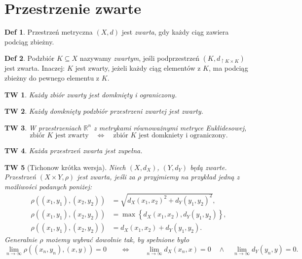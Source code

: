 \documentclass[a4paper, 12pt]{mwart}
\theoremstyle{definition}
\newtheorem{definicja}{Def}[section]
\theoremstyle{plain}
\newtheorem{twierdzenie}{TW}[section]
\theoremstyle{remark}
\begin{document}
\section{Przestrzenie zwarte}
\begin{definicja}
	Przestrzeń metryczna $(X, d)$ jest \emph{zwarta}, gdy każdy ciąg zawiera podciąg zbieżny.
\end{definicja}
\begin{definicja}
	Podzbiór $K \subseteq X$ nazywamy \emph{zwartym}, jeśli podprzestrzeń $(K, d_{\restriction K \times K})$ jest zwarta. Inaczej: $K$ jest zwarty, jeżeli każdy ciąg elementów z $K$, ma podciąg zbieżny do pewnego elementu z $K$.
\end{definicja}
\begin{twierdzenie}
	Każdy zbiór zwarty jest domknięty i ograniczony.
\end{twierdzenie}
\begin{twierdzenie}
	Każdy domknięty podzbiór przestrzeni zwartej jest zwarty.
\end{twierdzenie}
\begin{twierdzenie}
	W przestrzeniach $\mathbb{R}^n$ z metrykami równoważnymi metryce Euklidesowej,
	\begin{equation}
		\text{zbiór } K \text{ jest zwarty} \quad \iff \quad \text{zbiór } K \text{ jest domkniety i ograniczony}.
	\end{equation}
\end{twierdzenie}
\begin{twierdzenie}
	Każda przestrzeń zwarta jest zupełna.
\end{twierdzenie}
\begin{twierdzenie}[Tichonow \ppauza krótka wersja]
	Niech $(X, d_X)$, $(Y, d_Y)$ będą zwarte. Przestrzeń $(X \times Y, \rho)$ jest zwarta, jeśli za $\rho$ przyjmiemy na przykład jedną z możliwości podanych poniżej:
	\begin{align}
		\rho((x_1, y_1), (x_2, y_2)) &= \sqrt{{d_X(x_1, x_2)}^2 + {d_Y(y_1, y_2)}^2}, \\
		\rho((x_1, y_1), (x_2, y_2)) &= \max\left\{{d_X(x_1, x_2), d_Y(y_1, y_2)}\right\}, \\
		\rho((x_1, y_1), (x_2, y_2)) &= d_X(x_1, x_2) + {d_Y(y_1, y_2)}.
	\end{align}
	Generalnie $\rho$ możemy wybrać dowolnie tak, by spełnione było
	\begin{equation}
		\lim_{n \to \infty} \rho((x_n, y_n), (x, y)) = 0 \qquad \iff \qquad \lim_{n \to \infty} d_X(x_n, x) = 0 \quad\land\quad \lim_{n \to \infty} d_Y(y_n, y) = 0.
	\end{equation}
\end{twierdzenie}
\end{document}
